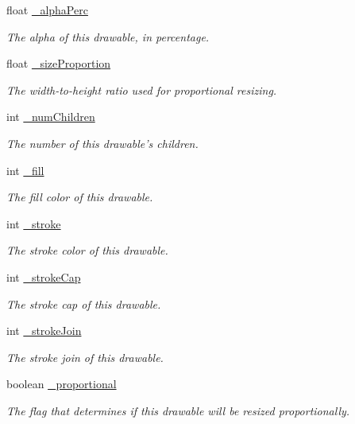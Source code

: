 \begin{DoxyCompactItemize}
float \hyperlink{classhype_1_1core_1_1drawable_1_1_h_drawable_a7567622bf145f03bc8897e9e399c2051}{\-\_\-alpha\-Perc}
\begin{DoxyCompactList}\small\item\em The alpha of this drawable, in percentage. \end{DoxyCompactList}\item 
float \hyperlink{classhype_1_1core_1_1drawable_1_1_h_drawable_a552d888b70c591af96f25c73320f269e}{\-\_\-size\-Proportion}
\begin{DoxyCompactList}\small\item\em The width-\/to-\/height ratio used for proportional resizing. \end{DoxyCompactList}\item 
int \hyperlink{classhype_1_1core_1_1drawable_1_1_h_drawable_a3d2ec798d880968b25a5c81a8dd31357}{\-\_\-num\-Children}
\begin{DoxyCompactList}\small\item\em The number of this drawable's children. \end{DoxyCompactList}\item 
int \hyperlink{classhype_1_1core_1_1drawable_1_1_h_drawable_a5f07bd6382bd895ca51c51a2285a31dc}{\-\_\-fill}
\begin{DoxyCompactList}\small\item\em The fill color of this drawable. \end{DoxyCompactList}\item 
int \hyperlink{classhype_1_1core_1_1drawable_1_1_h_drawable_aa773c8e474774a4f4b6437f77abdc85b}{\-\_\-stroke}
\begin{DoxyCompactList}\small\item\em The stroke color of this drawable. \end{DoxyCompactList}\item 
int \hyperlink{classhype_1_1core_1_1drawable_1_1_h_drawable_a35be29f7a889fada5549c5dfcaa98d7d}{\-\_\-stroke\-Cap}
\begin{DoxyCompactList}\small\item\em The stroke cap of this drawable. \end{DoxyCompactList}\item 
int \hyperlink{classhype_1_1core_1_1drawable_1_1_h_drawable_a3b021f60cc0552c6d1c5d4e298419dec}{\-\_\-stroke\-Join}
\begin{DoxyCompactList}\small\item\em The stroke join of this drawable. \end{DoxyCompactList}\item 
boolean \hyperlink{classhype_1_1core_1_1drawable_1_1_h_drawable_a1f42fdc1d43de75542c1b581d552dafa}{\-\_\-proportional}
\begin{DoxyCompactList}\small\item\em The flag that determines if this drawable will be resized proportionally. \end{DoxyCompactList}\end{DoxyCompactItemize}


